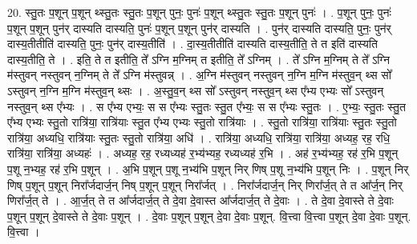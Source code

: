 \documentclass[17pt]{extarticle}
\begin{document}
20. स्तु॒तः प॒शून् प॒शून् थ्स्तु॒तः स्तु॒तः प॒शून् पुनः॒ पुनः॑ प॒शून् थ्स्तु॒तः स्तु॒तः प॒शून् पुनः॑ । . प॒शून् पुनः॒ पुनः॑ प॒शून् प॒शून् पुन॑र् दास्यति दास्यति॒ पुनः॑ प॒शून् प॒शून् पुन॑र् दास्यति । . पुन॑र् दास्यति दास्यति॒ पुनः॒ पुन॑र् दास्य॒तीतीति॑ दास्यति॒ पुनः॒ पुन॑र् दास्य॒तीति॑ । . दा॒स्य॒तीतीति॑ दास्यति दास्य॒तीति॒ ते त इति॑ दास्यति दास्य॒तीति॒ ते । . इति॒ ते त इतीति॒ ते᳚ ऽग्नि म॒ग्निम् त इतीति॒ ते᳚ ऽग्निम् । . ते᳚ ऽग्नि म॒ग्निम् ते ते᳚ ऽग्नि म॑स्तुवन् नस्तुवन् न॒ग्निम् ते ते᳚ ऽग्नि म॑स्तुवन्न् । . अ॒ग्नि म॑स्तुवन् नस्तुवन् न॒ग्नि म॒ग्नि म॑स्तुव॒न् थ्स सो᳚ ऽस्तुवन् न॒ग्नि म॒ग्नि म॑स्तुव॒न् थ्सः । . अ॒स्तु॒व॒न् थ्स सो᳚ ऽस्तुवन् नस्तुव॒न् थ्स ए᳚भ्य एभ्यः सो᳚ ऽस्तुवन् नस्तुव॒न् थ्स ए᳚भ्यः । . स ए᳚भ्य एभ्यः॒ स स ए᳚भ्यः स्तु॒तः स्तु॒त ए᳚भ्यः॒ स स ए᳚भ्यः स्तु॒तः । . ए॒भ्यः॒ स्तु॒तः स्तु॒त ए᳚भ्य एभ्यः स्तु॒तो रात्रि॑या॒ रात्रि॑याः स्तु॒त ए᳚भ्य एभ्यः स्तु॒तो रात्रि॑याः । . स्तु॒तो रात्रि॑या॒ रात्रि॑याः स्तु॒तः स्तु॒तो रात्रि॑या॒ अध्यधि॒ रात्रि॑याः स्तु॒तः स्तु॒तो रात्रि॑या॒ अधि॑ । . रात्रि॑या॒ अध्यधि॒ रात्रि॑या॒ रात्रि॑या॒ अध्यह॒ रह॒ रधि॒ रात्रि॑या॒ रात्रि॑या॒ अध्यहः॑ । . अध्यह॒ रह॒ रध्यध्यह॑ र॒भ्य॑भ्यह॒ रध्यध्यह॑ र॒भि । . अह॑ र॒भ्य॑भ्यह॒ रह॑ र॒भि प॒शून् प॒शू न॒भ्यह॒ रह॑ र॒भि प॒शून् । . अ॒भि प॒शून् प॒शू न॒भ्य॑भि प॒शून् निर् णिष् प॒शू न॒भ्य॑भि प॒शून् निः । . प॒शून् निर् णिष् प॒शून् प॒शून् निरा᳚र्जदार्ज॒न् निष् प॒शून् प॒शून् निरा᳚र्जत् । . निरा᳚र्जदार्ज॒न् निर् णिरा᳚र्ज॒त् ते त आ᳚र्ज॒न् निर् णिरा᳚र्ज॒त् ते । . आ॒र्ज॒त् ते त आ᳚र्जदार्ज॒त् ते दे॒वा दे॒वास्त आ᳚र्जदार्ज॒त् ते दे॒वाः । . ते दे॒वा दे॒वास्ते ते दे॒वाः प॒शून् प॒शून् दे॒वास्ते ते दे॒वाः प॒शून् । . दे॒वाः प॒शून् प॒शून् दे॒वा दे॒वाः प॒शून्. वि॒त्त्वा वि॒त्त्वा प॒शून् दे॒वा दे॒वाः प॒शून्. वि॒त्त्वा । \newline
\end{document}
